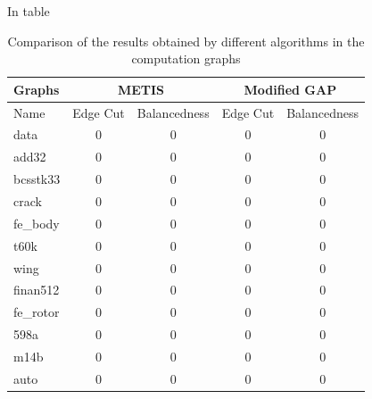 In table 

\begin{table}[h!]
\centering
\begin{tabular}{ |p{1.75cm}||cc|cc||  }
\hline
\hline
\textbf{Graphs} & \multicolumn{2}{|c|}{\textbf{METIS}} & \multicolumn{2}{|c|}{\textbf{Modified GAP}}  \\
\hline
\hline
Name & Edge Cut & Balancedness & Edge Cut & Balancedness \\
\hline
data & 0 & 0 & 0 & 0  \\
add32 & 0 & 0 & 0 & 0  \\
bcsstk33 & 0 & 0 & 0 & 0  \\
crack & 0 & 0 & 0 & 0  \\
\hline
fe\_body & 0 & 0 & 0 & 0   \\
t60k & 0 & 0 & 0 & 0  \\
wing & 0 & 0 & 0 & 0  \\
finan512 & 0 & 0 & 0 & 0  \\
\hline
fe\_rotor & 0 & 0 & 0 & 0  \\
598a & 0 & 0 & 0 & 0  \\
m14b & 0 & 0 & 0 & 0  \\
auto & 0 & 0 & 0 & 0  \\
\hline
\end{tabular}
\caption{\label{tab:comp_graphs}Comparison of the results obtained by different algorithms in the computation graphs}
\end{table}